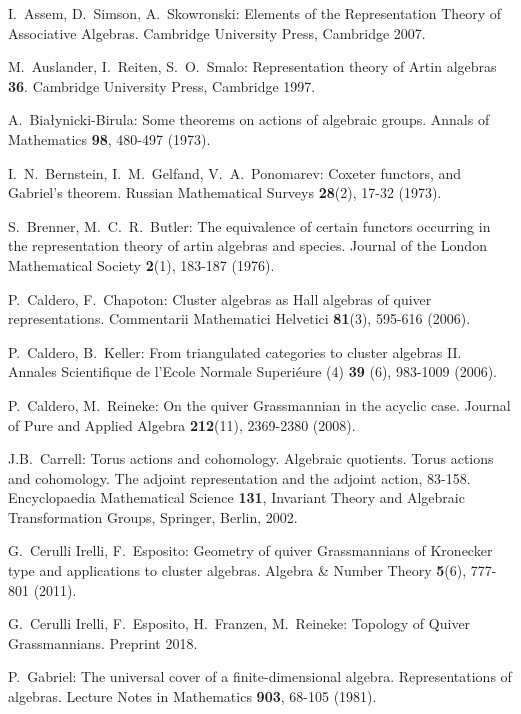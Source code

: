 \documentclass{amsart}
\numberwithin{equation}{section}
\begin{document}
\begin{thebibliography}{10}

  I.~Assem, D.~Simson, A.~Skowronski: Elements of the Representation Theory of Associative Algebras. Cambridge University Press, Cambridge 2007.

  M.~Auslander, I.~Reiten, S.~O.~Smalo: Representation theory of Artin algebras {\bf 36}. Cambridge University Press, Cambridge 1997.

  A.~Bia\l{}ynicki-Birula: Some theorems on actions of algebraic groups. Annals of Mathematics \textbf{98}, 480-497 (1973).

  I.~N.~Bernstein, I.~M.~Gelfand, V.~A.~Ponomarev: Coxeter functors, and Gabriel's theorem. Russian Mathematical Surveys \textbf{28}(2), 17-32 (1973).

  S.~Brenner, M.~C.~R.~Butler: The equivalence of certain functors occurring in the representation theory of artin algebras and species. Journal of the London Mathematical Society \textbf{2}(1), 183-187 (1976).

  P.~Caldero, F.~Chapoton: Cluster algebras as {H}all algebras of quiver representations. Commentarii Mathematici Helvetici \textbf{81}(3), 595-616 (2006).

  P.~Caldero, B.~Keller: From triangulated categories to cluster algebras II.  Annales Scientifique de l'Ecole Normale Superi\'{e}ure (4) \textbf{39} (6), 983-1009 (2006).

  P.~Caldero, M.~Reineke: On the quiver Grassmannian in the acyclic case. Journal of Pure and Applied Algebra \textbf{212}(11), 2369-2380 (2008).

	J.B.~Carrell: Torus actions and cohomology. Algebraic quotients. Torus actions and cohomology. The adjoint representation and the adjoint action, 83-158. Encyclopaedia Mathematical Science \textbf{131}, Invariant Theory and Algebraic Transformation Groups, Springer, Berlin, 2002.

  G.~Cerulli Irelli, F.~Esposito: Geometry of quiver Grassmannians of Kronecker type and applications to cluster algebras. Algebra \&  Number Theory \textbf{5}(6), 777-801 (2011).

  G.~Cerulli Irelli, F.~Esposito, H.~Franzen, M.~Reineke: Topology of Quiver Grassmannians. Preprint 2018.

  P.~Gabriel: The universal cover of a finite-dimensional algebra. Representations of algebras. Lecture Notes in Mathematics {\bf 903}, 68-105 (1981).


\end{thebibliography}
\end{document}
